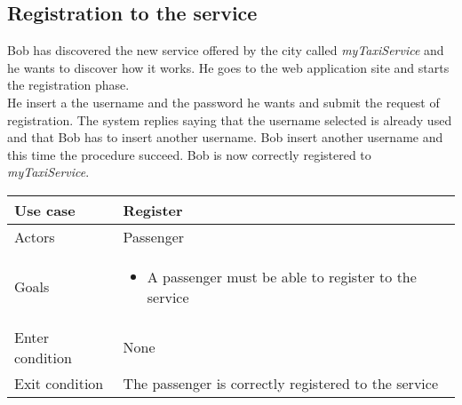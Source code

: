 \subsection{Registration to the service}
Bob has discovered the new service offered by the city called \textit{myTaxiService} and he wants to discover how it works. He goes to the web application site and starts the registration phase.\\
He insert a the username and the password he wants and submit the request of registration. The system replies saying that the username selected is already used and that Bob has to insert another username. Bob insert another username and this time the procedure succeed. Bob is now correctly registered to \textit{myTaxiService}.

\begin{table}[H]
\centering
\begin{tabularx}{\textwidth}{|l|X|} \hline
Use case & \textbf{Register} \\ \hline 
Actors & Passenger \\ \hline
Goals & \begin{itemize}
			\item A passenger must be able to register to the service
		\end{itemize} \\ \hline
Enter condition & None \\
Exit condition & The passenger is correctly registered to the service
\end{tabularx}
\end{table}